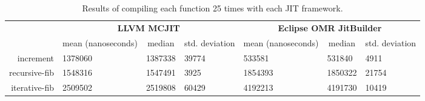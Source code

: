 \begin{table*}[t]
  \begin{tabular}{|r|l|l|l|l||l|l|}
  \hline
  \multicolumn{1}{|l|}{\multirow{2}{*}{}} & \multicolumn{3}{c|}{\textbf{LLVM MCJIT}}                                                                                     & \multicolumn{3}{c|}{\textbf{Eclipse OMR JitBuilder}}                                                                              \\ \cline{2-7}
  \multicolumn{1}{|c|}{\textbf{Program}}  & \multicolumn{1}{c|}{mean (nanoseconds)}  & \multicolumn{1}{c|}{median}  & \multicolumn{1}{c|}{std. deviation}                & \multicolumn{1}{c|}{mean (nanoseconds)}  & \multicolumn{1}{c|}{median}  & \multicolumn{1}{c|}{std. deviation}             \\ \hline
  increment                               & \num{1378060}                            & \num{1387338}                & \num{39774}                                        & \num{533581}                             & \num{531840}                & \num{4911}                                      \\ \hline
  recursive-fib                           & \num{1548316}                            & \num{1547491}                & \num{3925}                                         & \num{1854393}                            & \num{1850322}               & \num{21754}                                     \\ \hline
  iterative-fib                           & \num{2509502}                            & \num{2519808}                & \num{60429}                                        & \num{4192213}                            & \num{4191730}               & \num{10419}                                     \\ \hline
  \end{tabular}
  \caption{Results of compiling each function 25 times with each JIT framework.}
  \label{tab:compile_time}
\end{table*}

